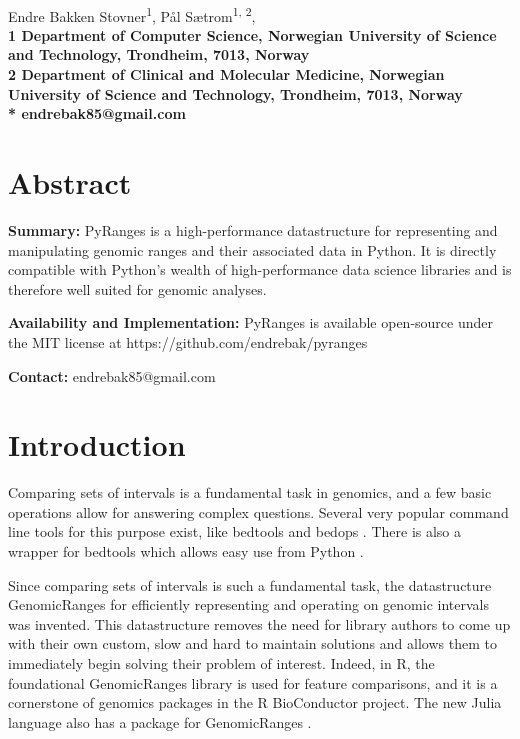 \documentclass[10pt,letterpaper]{article}
\begin{document}
\vspace*{0.35in}

\begin{flushleft}
{\Large
  \textbf{}
}
\newline
\\
Endre Bakken Stovner\textsuperscript{1},
Pål Sætrom\textsuperscript{1, 2},
\\
\bf{1} Department of
  Computer Science, Norwegian University
  of Science and Technology, Trondheim, 7013, Norway
\\
\bf{2} Department of Clinical and Molecular Medicine, Norwegian
  University of Science and Technology, Trondheim, 7013, Norway
\\
\bigskip
* endrebak85@gmail.com

\end{flushleft}

\section*{Abstract}

\textbf{Summary:} PyRanges is a high-performance datastructure for representing
and manipulating genomic ranges and their associated data in Python. It is
directly compatible with Python's wealth of high-performance data science
libraries and is therefore well suited for genomic analyses.

\textbf{Availability and Implementation:} PyRanges is available open-source under
the MIT license at https://github.com/endrebak/pyranges

\textbf{Contact:} endrebak85@gmail.com

\section*{Introduction}

Comparing sets of intervals is a fundamental task in genomics, and a few basic
operations allow for answering complex questions. Several very popular command
line tools for this purpose exist, like bedtools
\cite{doi:10.1093/bioinformatics/btq033} and bedops
\cite{doi:10.1093/bioinformatics/bts277}. There is also a wrapper for bedtools
which allows easy use from Python \cite{doi:10.1093/bioinformatics/btr539}.

Since comparing sets of intervals is such a fundamental task, the datastructure
GenomicRanges for efficiently representing and operating on genomic intervals
was invented. This datastructure removes the need for library authors to come up
with their own custom, slow and hard to maintain solutions and allows them to
immediately begin solving their problem of interest. Indeed, in R, the
foundational GenomicRanges library \cite{10.1371/journal.pcbi.1003118} is used
for feature comparisons, and it is a cornerstone of genomics packages in the R
BioConductor \cite{Gentleman2004} project. The new Julia language
\cite{doi:10.1137/141000671} also has a package for GenomicRanges
\cite{Haverty2017}.
\end{document}
